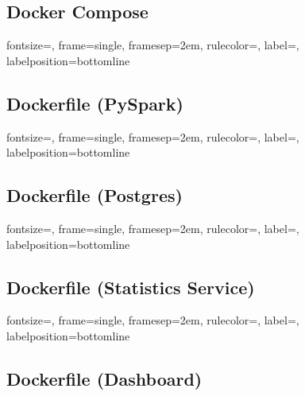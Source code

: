 \subsection{Docker Compose}\label{subsec:docker-compose}

{fontsize=\footnotesize,
    frame=single,
    framesep=2em,
    rulecolor=\color{Blue},
    label=,
    labelposition=bottomline
}


\subsection{Dockerfile (PySpark)}\label{subsec:dockerfile-(pyspark)}

{fontsize=\footnotesize,
    frame=single,
    framesep=2em,
    rulecolor=\color{Blue},
    label=,
    labelposition=bottomline
}


\subsection{Dockerfile (Postgres)}\label{subsec:dockerfile-(postgres)}

{fontsize=\footnotesize,
    frame=single,
    framesep=2em,
    rulecolor=\color{Blue},
    label=,
    labelposition=bottomline
}


\subsection{Dockerfile (Statistics Service)}\label{subsec:dockerfile-(statistics-service)}

{fontsize=\footnotesize,
    frame=single,
    framesep=2em,
    rulecolor=\color{Blue},
    label=,
    labelposition=bottomline
}


\subsection{Dockerfile (Dashboard)}\label{subsec:dockerfile-(dashboard)}

